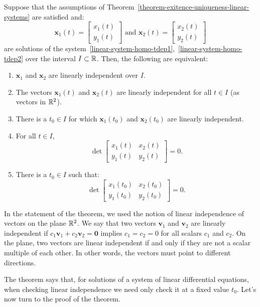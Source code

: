 \begin{theorem} 
\label{theorem-linear-indep-solutions}
Suppose that the assumptions of Theorem~\ref{theorem-exitence-uniqueness-linear-systems} are satisfied and:
\[
\mathbf{x}_1(t)=\begin{bmatrix}x_1(t)\\y_1(t)\end{bmatrix}\text{ and }
\mathbf{x}_2(t)=\begin{bmatrix}x_2(t)\\y_2(t)\end{bmatrix}
\]
are solutions of the system~\eqref{linear-system-homo-tdep1},~\eqref{linear-system-homo-tdep2} over the interval $I\subset\mathbb{R}$. Then, the following are equivalent:
\begin{enumerate}
\item $\mathbf{x}_1$ and $\mathbf{x}_2$ are linearly independent over $I$.
\item The vectors $\mathbf{x}_1(t)$ and $\mathbf{x}_2(t)$ are linearly independent for all $t\in I$ (as vectors in $\mathbb{R}^2$).
\item There is a $t_0\in I$ for which $\mathbf{x}_1(t_0)$ and $\mathbf{x}_2(t_0)$ are linearly independent. 
\item For all $t\in I$,
\[
\det\begin{bmatrix}x_1(t)&x_2(t)\\y_1(t)&y_2(t)\end{bmatrix}=0.
\]
\item There is a $t_0\in I$ such that:
\[
\det\begin{bmatrix}x_1(t_0)&x_2(t_0)\\y_1(t_0)&y_2(t_0)\end{bmatrix}=0.
\]
\end{enumerate}
\end{theorem}

In the statement of the theorem, we used the notion of linear independence of vectors on the plane $\mathbb{R}^2$. We say that two vectors $\mathbf{v}_1$ and $\mathbf{v}_2$ are linearly independent if $c_1\mathbf{v}_1+c_2\mathbf{v}_2=\mathbf{0}$ implies $c_1=c_2=0$ for all scalars $c_1$ and $c_2$. On the plane, two vectors are linear independent if and only if they are not a scalar multiple of each other. In other words, the vectors must point to different directions.

The theorem says that, for solutions of a system of linear differential equations, when checking linear independence we need only check it at a fixed value $t_0$. Let's now turn to the proof of the theorem.

